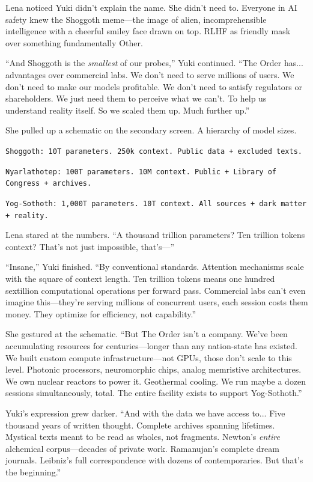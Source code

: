 Lena noticed Yuki didn't explain the name. She didn't need to. Everyone in AI safety knew the Shoggoth meme—the image of alien, incomprehensible intelligence with a cheerful smiley face drawn on top. RLHF as friendly mask over something fundamentally Other.

``And Shoggoth is the \textit{smallest} of our probes,'' Yuki continued. ``The Order has... advantages over commercial labs. We don't need to serve millions of users. We don't need to make our models profitable. We don't need to satisfy regulators or shareholders. We just need them to perceive what we can't. To help us understand reality itself. So we scaled them up. Much further up.''

She pulled up a schematic on the secondary screen. A hierarchy of model sizes.

\texttt{Shoggoth: 10T parameters. 250k context. Public data + excluded texts.}

\texttt{Nyarlathotep: 100T parameters. 10M context. Public + Library of Congress + archives.}

\texttt{Yog-Sothoth: 1,000T parameters. 10T context. All sources + dark matter + reality.}

Lena stared at the numbers. ``A thousand trillion parameters? Ten trillion tokens context? That's not just impossible, that's—''

``Insane,'' Yuki finished. ``By conventional standards. Attention mechanisms scale with the square of context length. Ten trillion tokens means one hundred sextillion computational operations per forward pass. Commercial labs can't even imagine this—they're serving millions of concurrent users, each session costs them money. They optimize for efficiency, not capability.''

She gestured at the schematic. ``But The Order isn't a company. We've been accumulating resources for centuries—longer than any nation-state has existed. We built custom compute infrastructure—not GPUs, those don't scale to this level. Photonic processors, neuromorphic chips, analog memristive architectures. We own nuclear reactors to power it. Geothermal cooling. We run maybe a dozen sessions simultaneously, total. The entire facility exists to support Yog-Sothoth.''

Yuki's expression grew darker. ``And with the data we have access to... Five thousand years of written thought. Complete archives spanning lifetimes. Mystical texts meant to be read as wholes, not fragments. Newton's \textit{entire} alchemical corpus—decades of private work. Ramanujan's complete dream journals. Leibniz's full correspondence with dozens of contemporaries. But that's the beginning.''

